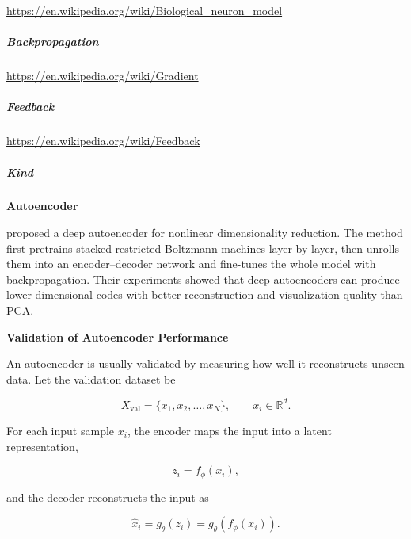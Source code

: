 \documentclass{book}
\providecommand{\ProjectDeepHeading}[2]{%
    \par\medskip\noindent\textbf{#2}\par\smallskip
}
\begin{document}
\url{https://en.wikipedia.org/wiki/Biological_neuron_model}

\subparagraph{Backpropagation}


\url{https://en.wikipedia.org/wiki/Gradient}

\subparagraph{Feedback}


\url{https://en.wikipedia.org/wiki/Feedback}

\subparagraph{Kind}

\ProjectDeepHeading{1}{Autoencoder}


\cite{hinton-2006-reducing-the-dimensionality-of-data-with-neural-networks} proposed a deep autoencoder for nonlinear dimensionality reduction.
    The method first pretrains stacked restricted Boltzmann machines layer by layer, then unrolls them into an encoder--decoder network and fine-tunes the whole model with backpropagation.
    Their experiments showed that deep autoencoders can produce lower-dimensional codes with better reconstruction and visualization quality than PCA.


\ProjectDeepHeading{4}{Validation of Autoencoder Performance}
        
        An autoencoder is usually validated by measuring how well it reconstructs unseen data.
        Let the validation dataset be
        
        \[
            X_{\mathrm{val}}=\{x_1,x_2,\dots,x_N\},
            \qquad
            x_i \in \mathbb{R}^{d}.
        \]
        
        For each input sample \(x_i\), the encoder maps the input into a latent representation,
        
        \[
            z_i=f_{\ensuremath{\phi}}(x_i),
        \]
        
        and the decoder reconstructs the input as
        
        \[
            \hat{x}_i=g_{\ensuremath{\theta}}(z_i)=g_{\ensuremath{\theta}}(f_{\ensuremath{\phi}}(x_i)).
        \]
        
\end{document}
